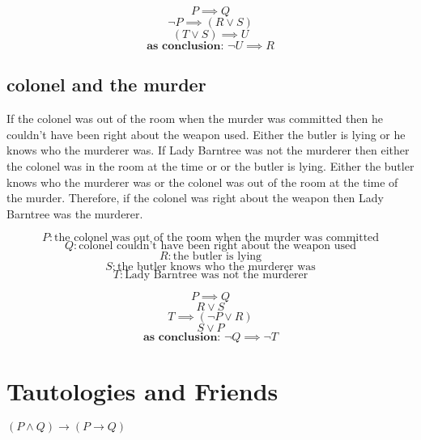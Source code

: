 \documentclass[a4paper,12pt]{article}
\begin{document}
\begin{equation} 
P \implies Q 
\end{equation}
\begin{equation} 
\neg P \implies (R \vee S)
\end{equation}
\begin{equation} 
(T \vee S) \implies U
\end{equation}
\begin{equation} 
\textbf{as conclusion: } \neg U \implies R
\end{equation}

\subsection{colonel and the murder}
If the colonel was out of the room when the murder was committed then he couldn't have been right about the weapon used.  Either the butler is lying or he knows who the murderer was.  If Lady Barntree was not the murderer then either the colonel was in the room at the time or or the butler is lying.  Either the butler knows who the murderer was or the colonel was out of the room at the time of the murder.  Therefore, if the colonel was right about the weapon then Lady Barntree was the murderer.

\[
P: \text{the colonel was out of the room when the murder was committed}  
\]
\[
Q: \text{colonel couldn't have been right about the weapon used} 
\]
\[
R: \text{the butler is lying} 
\]
\[
S: \text{the butler knows who the murderer was}
\]
\[
T: \text{Lady Barntree was not the murderer} 
\]

\begin{equation} 
P \implies Q 
\end{equation}
\begin{equation} 
R \vee S
\end{equation}
\begin{equation} 
T \implies (\neg P \vee R)
\end{equation}
\begin{equation} 
S \vee P
\end{equation}
\begin{equation} 
\textbf{as conclusion: } \neg Q \implies \neg T
\end{equation}
\section{Tautologies and Friends}

$(P \wedge Q) \rightarrow (P \rightarrow Q)$\\
\end{document}
